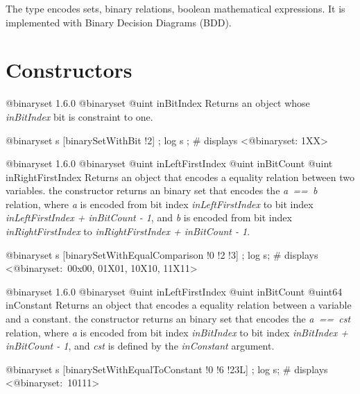 

The  type encodes sets, binary relations, boolean mathematical expressions. It is implemented with Binary Decision Diagrams (BDD).


\section{Constructors}

{@binaryset}
{1.6.0}
{@binaryset}
{@uint inBitIndex}
{Returns an  object whose \emph{inBitIndex} bit is constraint to one.}
{}

\exempleDeuxLignes
{}
{@binaryset s [binarySetWithBit !2] ;}
{log s ; \# displays <@binaryset: 1XX>}





{@binaryset}
{1.6.0}
{@binaryset}
{@uint inLeftFirstIndex}
{@uint inBitCount}
{@uint inRightFirstIndex}
{Returns an  object that encodes a equality relation between two variables.}
{the constructor returns an binary set that encodes the \emph{a~==~b} relation, where \emph{a} is encoded from bit index \emph{inLeftFirstIndex} to bit index \emph{inLeftFirstIndex  + inBitCount - 1}, and \emph{b} is encoded from bit index \emph{inRightFirstIndex} to \emph{inRightFirstIndex + inBitCount - 1}.}

\exempleDeuxLignes
{}
{@binaryset s [binarySetWithEqualComparison !0 !2 !3] ;}
{log s; \# displays <@binaryset:~00x00, 01X01, 10X10, 11X11>}





{@binaryset}
{1.6.0}
{@binaryset}
{@uint inLeftFirstIndex}
{@uint inBitCount}
{@uint64 inConstant}
{Returns an  object that encodes a equality relation between a variable and a constant.}
{the constructor returns an binary set that encodes the \emph{a~==~cst} relation, where \emph {a} is encoded from bit index \emph{inBitIndex} to bit index \emph{inBitIndex  + inBitCount - 1}, and \emph{cst} is defined by the \emph{inConstant} argument.}

\exempleDeuxLignes
{}
{@binaryset s [binarySetWithEqualToConstant !0 !6 !23L] ;}
{log s; \# displays <@binaryset:~10111>}





